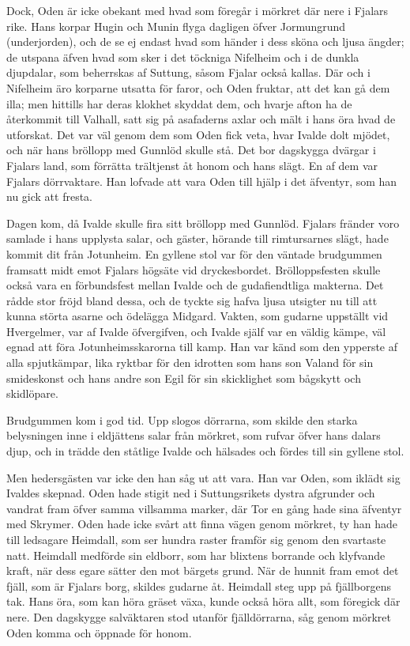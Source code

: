 Dock, Oden är icke obekant med hvad som föregår i mörkret där nere i
Fjalars rike. Hans korpar Hugin och Munin flyga dagligen öfver
Jormungrund (underjorden), och de se ej endast hvad som händer i dess
sköna och ljusa ängder; de utspana äfven hvad som sker i det töckniga
Nifelheim och i de dunkla djupdalar, som beherrskas af Suttung, såsom
Fjalar också kallas. Där och i Nifelheim äro korparne utsatta för faror,
och Oden fruktar, att det kan gå dem illa; men hittills har deras
klokhet skyddat dem, och hvarje afton ha de återkommit till Valhall,
satt sig på asafaderns axlar och mält i hans öra hvad de utforskat. Det
var väl genom dem som Oden fick veta, hvar Ivalde dolt mjödet, och när
hans bröllopp med Gunnlöd skulle stå. Det bor dagskygga dvärgar i
Fjalars land, som förrätta trältjenst åt honom och hans slägt. En af dem
var Fjalars dörrvaktare. Han lofvade att vara Oden till hjälp i det
äfventyr, som han nu gick att fresta.

Dagen kom, då Ivalde skulle fira sitt bröllopp med Gunnlöd. Fjalars
fränder voro samlade i hans upplysta salar, och gäster, hörande till
rimtursarnes slägt, hade kommit dit från Jotunheim. En gyllene stol var
för den väntade brudgummen framsatt midt emot Fjalars högsäte vid
dryckesbordet. Brölloppsfesten skulle också vara en förbundsfest mellan
Ivalde och de gudafiendtliga makterna. Det rådde stor fröjd bland dessa,
och de tyckte sig hafva ljusa utsigter nu till att kunna störta asarne
och ödelägga Midgard. Vakten, som gudarne uppställt vid Hvergelmer, var
af Ivalde öfvergifven, och Ivalde själf var en väldig kämpe, väl egnad
att föra Jotunheimsskarorna till kamp. Han var känd som den ypperste af
alla spjutkämpar, lika ryktbar för den idrotten som
\protect\hypertarget{lb1625905.xhtmlux5cux23start70}{}{}\protect\hypertarget{lb1625905.xhtmlux5cux23start70-a}{}{}\protect\hypertarget{lb1625905.xhtmlux5cux23start70-b}{}{}\protect\hypertarget{lb1625905.xhtmlux5cux23start70-c}{}{}\protect\hypertarget{lb1625905.xhtmlux5cux23start70-d}{}{}
hans son Valand för sin smideskonst och hans andre son Egil för sin
skicklighet som bågskytt och skidlöpare.

Brudgummen kom i god tid. Upp slogos dörrarna, som skilde den starka
belysningen inne i eldjättens salar från mörkret, som rufvar öfver hans
dalars djup, och in trädde den ståtlige Ivalde och hälsades och fördes
till sin gyllene stol.

Men hedersgästen var icke den han såg ut att vara. Han var Oden, som
iklädt sig Ivaldes skepnad. Oden hade stigit ned i Suttungsrikets dystra
afgrunder och vandrat fram öfver samma villsamma marker, där Tor en gång
hade sina äfventyr med Skrymer. Oden hade icke svårt att finna vägen
genom mörkret, ty han hade till ledsagare Heimdall, som ser hundra
raster framför sig genom den svartaste natt. Heimdall medförde sin
eldborr, som har blixtens borrande och klyfvande kraft, när dess egare
sätter den mot bärgets grund. När de hunnit fram emot det fjäll, som är
Fjalars borg, skildes gudarne åt. Heimdall steg upp på fjällborgens tak.
Hans öra, som kan höra gräset växa, kunde också höra allt, som föregick
där nere. Den dagskygge salväktaren stod utanför fjälldörrarna, såg
genom mörkret Oden komma och öppnade för honom.

